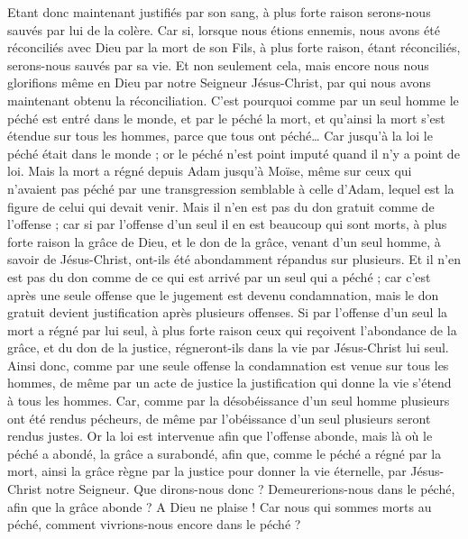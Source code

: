 \begin{multicols}{2}
Etant donc maintenant justifiés par son sang, à plus forte raison serons-nous sauvés par lui de la colère.
Car si, lorsque nous étions ennemis, nous avons été réconciliés avec Dieu par la mort de son Fils, à plus forte raison, étant réconciliés, serons-nous sauvés par sa vie.
Et non seulement cela, mais encore nous nous glorifions même en Dieu par notre Seigneur Jésus-Christ, par qui nous avons maintenant obtenu la réconciliation.
C'est pourquoi comme par un seul homme le péché est entré dans le monde, et par le péché la mort, et qu’ainsi la mort s’est étendue sur tous les hommes, parce que tous ont péché…
Car jusqu'à la loi le péché était dans le monde ; or le péché n'est point imputé quand il n'y a point de loi.
Mais la mort a régné depuis Adam jusqu'à Moïse, même sur ceux qui n'avaient pas péché par une transgression semblable à celle d’Adam, lequel est la figure de celui qui devait venir.
Mais il n'en est pas du don gratuit comme de l'offense ; car si par l'offense d'un seul il en est beaucoup qui sont morts, à plus forte raison la grâce de Dieu, et le don de la grâce, venant d'un seul homme, à savoir de Jésus-Christ, ont-ils été abondamment répandus sur plusieurs.
Et il n'en est pas du don comme de ce qui est arrivé par un seul qui a péché ; car c’est après une seule offense que le jugement est devenu condamnation, mais le don gratuit devient justification après plusieurs offenses.
Si par l'offense d'un seul la mort a régné par lui seul, à plus forte raison ceux qui reçoivent l'abondance de la grâce, et du don de la justice, régneront-ils dans la vie par Jésus-Christ lui seul.
Ainsi donc, comme par une seule offense la condamnation est venue sur tous les hommes, de même par un acte de justice la justification qui donne la vie s’étend à tous les hommes.
Car, comme par la désobéissance d'un seul homme plusieurs ont été rendus pécheurs, de même par l'obéissance d'un seul plusieurs seront rendus justes.
Or la loi est intervenue afin que l'offense abonde, mais là où le péché a abondé, la grâce a surabondé,
afin que, comme le péché a régné par la mort, ainsi la grâce règne par la justice pour donner la vie éternelle, par Jésus-Christ notre Seigneur.
\VerseOne{}Que dirons-nous donc ? Demeurerions-nous dans le péché, afin que la grâce abonde ?
A Dieu ne plaise ! Car nous qui sommes morts au péché, comment vivrions-nous encore dans le péché ?

\end{multicols}
